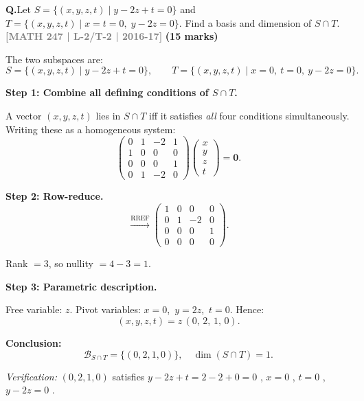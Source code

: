 \documentclass[12pt,a3paper]{article}
\newcommand{\yr}[1]{\hfill\textcolor{gray}{\small\textbf{[#1]}}}
\newcommand{\mk}[1]{\textcolor{orange!70!black}{\small\textbf{(#1 marks)}}}
\newcounter{qnum}
\newcommand{\Q}[1]{%
  \needspace{4\baselineskip}
  \refstepcounter{qnum}
  \vspace{6pt}
  \noindent\textbf{Q\theqnum.}\enspace #1\par
}
\begin{document}
\Q{Let $S = \{(x,y,z,t)\mid y - 2z + t = 0\}$ and $T = \{(x,y,z,t)\mid x = t = 0,\; y - 2z = 0\}$. Find a basis and dimension of $S \cap T$.
\yr{MATH 247 | L-2/T-2 | 2016-17} \mk{15}}

\begin{tcolorbox}[enhanced,breakable,
  colback=cC!4,colframe=cC,boxrule=0.8pt,arc=5pt,
  title={\textbf{Answer --- Basis and Dimension of $S\cap T$}},
  fonttitle=\bfseries\color{white},colbacktitle=cC]

The two subspaces are:
\[
S = \{(x,y,z,t)\mid y - 2z + t = 0\}, \qquad
T = \{(x,y,z,t)\mid x = 0,\ t = 0,\ y - 2z = 0\}.
\]

\textbf{Step 1: Combine all defining conditions of $S\cap T$.}

A vector $(x,y,z,t)$ lies in $S\cap T$ iff it satisfies \emph{all} four conditions simultaneously. Writing these as a homogeneous system:
\[
\begin{pmatrix}
0 & 1 & -2 & 1 \\
1 & 0 &  0 & 0 \\
0 & 0 &  0 & 1 \\
0 & 1 & -2 & 0
\end{pmatrix}
\begin{pmatrix}x\\y\\z\\t\end{pmatrix} = \mathbf{0}.
\]

\textbf{Step 2: Row-reduce.}
\[
\xrightarrow{\text{RREF}}
\begin{pmatrix}
1 & 0 &  0 & 0 \\
0 & 1 & -2 & 0 \\
0 & 0 &  0 & 1 \\
0 & 0 &  0 & 0
\end{pmatrix}.
\]

Rank $= 3$, so nullity $= 4 - 3 = 1$.

\textbf{Step 3: Parametric description.}

Free variable: $z$. Pivot variables: $x = 0$,\ $y = 2z$,\ $t = 0$. Hence:
\[
(x,y,z,t) = z\,(0,\,2,\,1,\,0).
\]

\textbf{Conclusion:}
\[
\boxed{\mathcal{B}_{S\cap T} = \{(0,2,1,0)\}, \quad \dim(S\cap T) = 1.}
\]

\textit{Verification: } $(0,2,1,0)$ satisfies $y-2z+t = 2-2+0 = 0$ \checkmark, $x=0$ \checkmark, $t=0$ \checkmark, $y-2z = 0$ \checkmark.

\end{tcolorbox}
\end{document}
